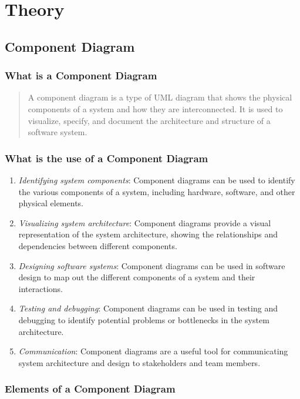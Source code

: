 \documentclass[11pt]{article}
\begin{document}
\section{Theory}

\subsection{Component Diagram}

\subsubsection{What is a Component Diagram}

\begin{quotation}
	A component diagram is a type of UML diagram that shows the physical components of a system and how they are interconnected. It is used to visualize, specify, and document the architecture and structure of a software system.
\end{quotation}

\subsubsection{What is the use of a Component Diagram}

\begin{enumerate}
	\item \textit{Identifying system components}: Component diagrams can be used to identify the various components of a system, including hardware, software, and other physical elements.
	\item \textit{Visualizing system architecture}: Component diagrams provide a visual representation of the system architecture, showing the relationships and dependencies between different components.
	\item \textit{Designing software systems}: Component diagrams can be used in software design to map out the different components of a system and their interactions.
	\item \textit{Testing and debugging}: Component diagrams can be used in testing and debugging to identify potential problems or bottlenecks in the system architecture.
	\item \textit{Communication}: Component diagrams are a useful tool for communicating system architecture and design to stakeholders and team members.
\end{enumerate}

\subsubsection{Elements of a Component Diagram}
\end{document}
